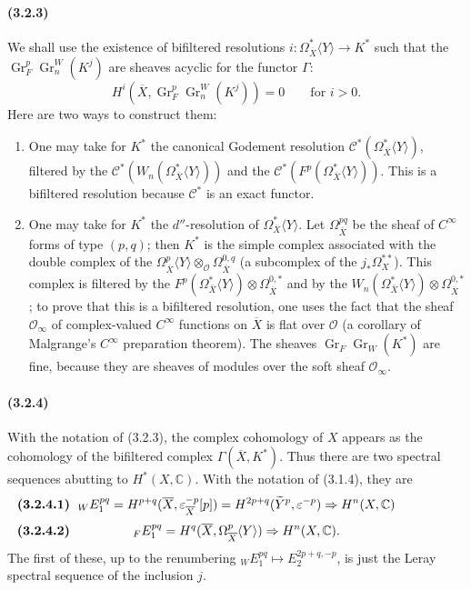 \documentclass[10pt]{article}
\newcommand{\C}{\mathbb C}
\newcommand{\Gr}{\operatorname{Gr}}
\begin{document}
\paragraph{(3.2.3)} We shall use the existence of bifiltered resolutions $i:\Omega_{\overline X}^{*}\langle Y\rangle\longrightarrow K^*$ such that the $\Gr_F^p\Gr_n^W(K^j)$ are sheaves acyclic for the functor $\Gamma$:
\[
H^i(\overline X,\Gr_F^p\Gr_n^W(K^j))=0\qquad \text{for }i>0.
\]
Here are two ways to construct them:
\begin{enumerate}[label=\textit{\alph*)}]
\item One may take for $K^*$ the canonical Godement resolution $\mathcal C^*(\Omega_{\overline X}^{*}\langle Y\rangle)$, filtered by the $\mathcal C^*(W_n(\Omega_{\overline X}^{*}\langle Y\rangle))$ and the $\mathcal C^*(F^p(\Omega_{\overline X}^{*}\langle Y\rangle))$. This is a bifiltered resolution because $\mathcal C^*$ is an exact functor.
\item One may take for $K^*$ the $d''$-resolution of $\Omega_{\overline X}^{*}\langle Y\rangle$. Let $\Omega_{\overline X}^{pq}$ be the sheaf of $C^\infty$ forms of type $(p,q)$; then $K^*$ is the simple complex associated with the double complex of the $\Omega_{\overline X}^{p}\langle Y\rangle\otimes_{\mathcal O}\Omega_{\overline X}^{0,q}$ (a subcomplex of the $j_*\Omega_X^{**}$). This complex is filtered by the $F^p(\Omega_{\overline X}^{*}\langle Y\rangle)\otimes\Omega_{\overline X}^{0,*}$ and by the $W_n(\Omega_{\overline X}^{*}\langle Y\rangle)\otimes\Omega_{\overline X}^{0,*}$; to prove that this is a bifiltered resolution, one uses the fact that the sheaf $\mathcal O_\infty$ of complex-valued $C^\infty$ functions on $\overline X$ is flat over $\mathcal O$ (a corollary of Malgrange's $C^\infty$ preparation theorem). The sheaves $\Gr_F\Gr_W(K^*)$ are fine, because they are sheaves of modules over the soft sheaf $\mathcal O_\infty$.
\end{enumerate}

\paragraph{(3.2.4)} With the notation of (3.2.3), the complex cohomology of $X$ appears as the cohomology of the bifiltered complex $\Gamma(\overline X,K^*)$. Thus there are two spectral sequences abutting to $H^*(X,\C)$. With the notation of (3.1.4), they are
\[
\makebox[\textwidth][s]{\textbf{(3.2.4.1)}\hfill$\displaystyle {}_W E_1^{pq}=H^{p+q}(\overline X,\varepsilon_{\overline X}^{-p}[p])=H^{2p+q}(\widetilde Y^p,\varepsilon^{-p})\Rightarrow H^n(X,\C)$\hfill\phantom{\textbf{(3.2.4.1)}}}
\]
\[
\makebox[\textwidth][s]{\textbf{(3.2.4.2)}\hfill$\displaystyle {}_F E_1^{pq}=H^q(\overline X,\Omega_{\overline X}^p\langle Y\rangle)\Rightarrow H^n(X,\C).$\hfill\phantom{\textbf{(3.2.4.2)}}}
\]
The first of these, up to the renumbering ${}_W E_1^{pq}\mapsto E_2^{2p+q,-p}$, is just the Leray spectral sequence of the inclusion $j$.
\end{document}
